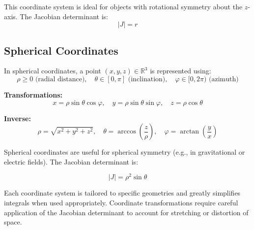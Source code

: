 This coordinate system is ideal for objects with rotational symmetry about the \( z \)-axis. The Jacobian determinant is:
\[
|J| = r
\]


\subsection{Spherical Coordinates}

In spherical coordinates, a point \( (x, y, z) \in \mathbb{R}^3 \) is represented using:
\[
\rho \ge 0 \text{ (radial distance)}, \quad \theta \in [0, \pi] \text{ (inclination)}, \quad \varphi \in [0, 2\pi) \text{ (azimuth)}
\]

\textbf{Transformations:}
\[
x = \rho \sin \theta \cos \varphi, \quad y = \rho \sin \theta \sin \varphi, \quad z = \rho \cos \theta
\]

\textbf{Inverse:}
\[
\rho = \sqrt{x^2 + y^2 + z^2}, \quad \theta = \arccos\left(\frac{z}{\rho}\right), \quad \varphi = \arctan\left(\frac{y}{x}\right)
\]

Spherical coordinates are useful for spherical symmetry (e.g., in gravitational or electric fields). The Jacobian determinant is:

\[
|J| = \rho^2 \sin \theta
\]


Each coordinate system is tailored to specific geometries and greatly 
simplifies integrals when used appropriately. 
Coordinate transformations require careful application of the Jacobian 
determinant to account for stretching or distortion of space.

